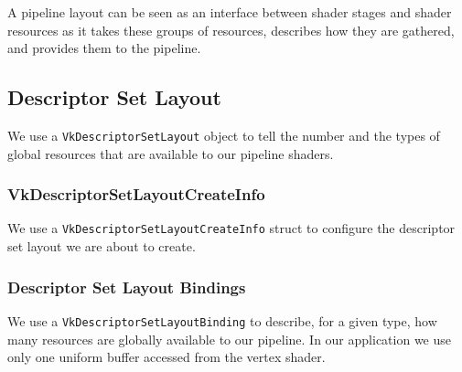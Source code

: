 A pipeline layout can be seen as an interface between shader stages
and shader resources as it takes these groups of resources, describes how
they are gathered, and provides them to the pipeline.

\begin{minipage}{\linewidth}{\noindent}
    
\end{minipage}

\subsection{Descriptor Set Layout}

We use a \texttt{VkDescriptorSetLayout} object to tell the number and the types
of global resources that are available to our pipeline shaders.

\begin{minipage}{\linewidth}{\noindent}
    
\end{minipage}

\subsubsection{VkDescriptorSetLayoutCreateInfo}

We use a \texttt{VkDescriptorSetLayoutCreateInfo} struct to configure the
descriptor set layout we are about to create.

\begin{minipage}{\linewidth}{\noindent}
    
\end{minipage}

\subsubsection{Descriptor Set Layout Bindings}

We use a \texttt{VkDescriptorSetLayoutBinding} to describe, for a given type,
how many resources are globally available to our pipeline.
In our application we use only one uniform buffer accessed from the vertex shader.

